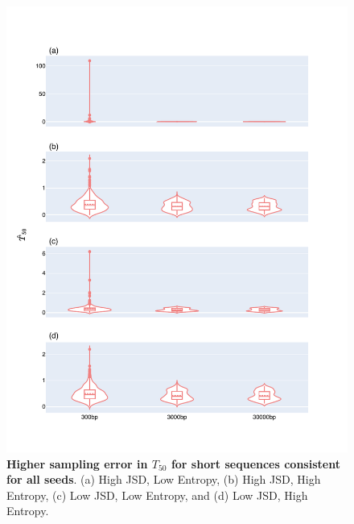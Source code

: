 \begin{figure}[!ht]
\centering
\includegraphics[width=\textwidth]{figures/plots/synthetic/T50/all_seeds.pdf}
\caption[Higher sampling error in $T_{50}$ for short sequences consistent for all seeds]{\textbf{Higher sampling error in $T_{50}$ for short sequences consistent for all seeds}. (a) High JSD, Low Entropy, (b) High JSD, High Entropy, (c)  Low JSD, Low Entropy, and (d) Low JSD, High Entropy.}
\label{fig:synthetic/T50/all-seeds}
\end{figure}